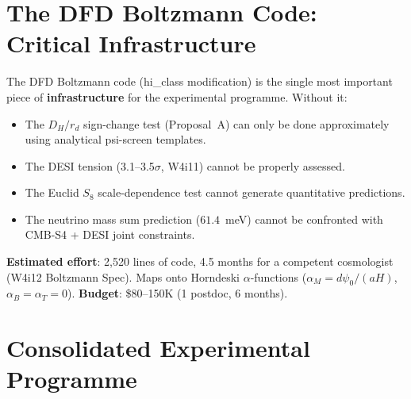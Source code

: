 \documentclass[11pt]{article}
\begin{document}
\part{The DFD Boltzmann Code: Critical Infrastructure}
\label{part:boltzmann}

\label{sec:boltzmann}

\begin{tcolorbox}[colback=red!5!white, colframe=warncolor,
  title=\textbf{URGENT: DFD BOLTZMANN CODE NEEDED FOR ALL COSMOLOGICAL TESTS}]
The DFD Boltzmann code (hi\_class modification) is the single most
important piece of \textbf{infrastructure} for the experimental programme.
Without it:
\begin{itemize}[nosep]
\item The $D_H/r_d$ sign-change test (Proposal~A) can only be done
  approximately using analytical psi-screen templates.
\item The DESI tension (3.1--3.5$\sigma$, W4i11) cannot be properly
  assessed.
\item The Euclid $S_8$ scale-dependence test cannot generate
  quantitative predictions.
\item The neutrino mass sum prediction ($61.4$~meV) cannot be confronted
  with CMB-S4 + DESI joint constraints.
\end{itemize}
\textbf{Estimated effort}: 2,520 lines of code, 4.5 months for a
competent cosmologist (W4i12 Boltzmann Spec). Maps onto Horndeski
$\alpha$-functions ($\alpha_M = d\psi_0/(aH)$, $\alpha_B = \alpha_T = 0$).
\textbf{Budget}: \$80--150K (1 postdoc, 6 months).
\end{tcolorbox}


\part{Consolidated Experimental Programme}
\label{part:consolidated}
\end{document}
